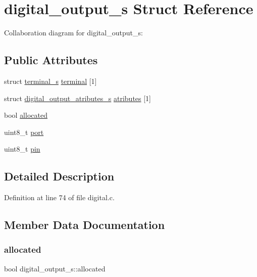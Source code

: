\hypertarget{structdigital__output__s}{}\section{digital\+\_\+output\+\_\+s Struct Reference}
\label{structdigital__output__s}


Collaboration diagram for digital\+\_\+output\+\_\+s\+:
\subsection*{Public Attributes}
\begin{DoxyCompactItemize}
\item 
struct \hyperlink{structterminal__s}{terminal\+\_\+s} \hyperlink{structdigital__output__s_a294f076a7d42393094f4c04ef036a374}{terminal} \mbox{[}1\mbox{]}
\item 
struct \hyperlink{structdigital__output__atributes__s}{digital\+\_\+output\+\_\+atributes\+\_\+s} \hyperlink{structdigital__output__s_aa3c73b4b174cbfc7299281b4ed8bcc78}{atributes} \mbox{[}1\mbox{]}
\item 
bool \hyperlink{structdigital__output__s_a5b1a6641664c6ce9198647ae65f6a7e1}{allocated}
\item 
uint8\+\_\+t \hyperlink{structdigital__output__s_a5d513737c83af463aec8d0d273df10dc}{port}
\item 
uint8\+\_\+t \hyperlink{structdigital__output__s_a368667bd7043bb3dd603ffcf94cc7bcc}{pin}
\end{DoxyCompactItemize}


\subsection{Detailed Description}


Definition at line 74 of file digital.\+c.



\subsection{Member Data Documentation}
\mbox{\label{structdigital__output__s_a5b1a6641664c6ce9198647ae65f6a7e1}} 
\subsubsection{\texorpdfstring{allocated}{allocated}}
{\footnotesize\ttfamily bool digital\+\_\+output\+\_\+s\+::allocated}



